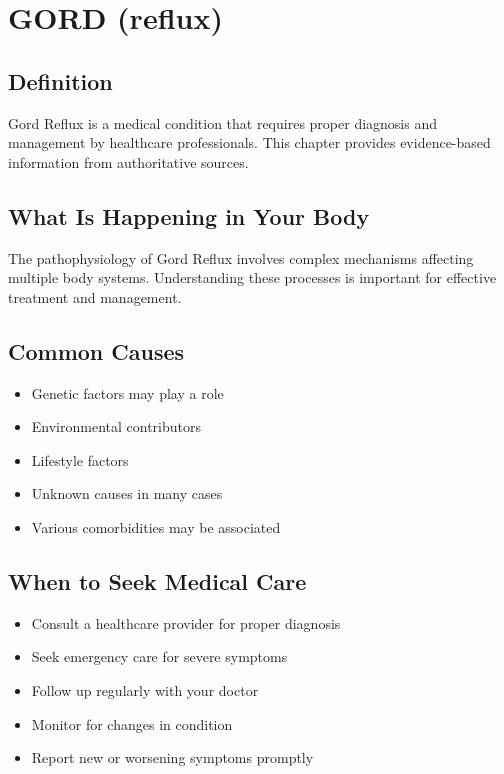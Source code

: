
\chapter{GORD (reflux)}

\section*{Definition}
Gord Reflux is a medical condition that requires proper diagnosis and management by healthcare professionals. This chapter provides evidence-based information from authoritative sources.

\section*{What Is Happening in Your Body}
The pathophysiology of Gord Reflux involves complex mechanisms affecting multiple body systems. Understanding these processes is important for effective treatment and management.

\section*{Common Causes}
\begin{itemize}
  \item Genetic factors may play a role
  \item Environmental contributors
  \item Lifestyle factors
  \item Unknown causes in many cases
  \item Various comorbidities may be associated
\end{itemize}

\section*{When to Seek Medical Care}
\begin{itemize}
  \item Consult a healthcare provider for proper diagnosis
  \item Seek emergency care for severe symptoms
  \item Follow up regularly with your doctor
  \item Monitor for changes in condition
  \item Report new or worsening symptoms promptly
\end{itemize}

